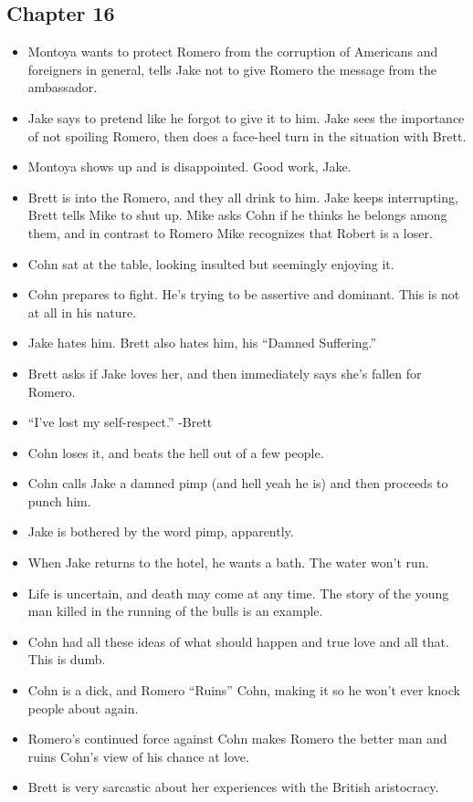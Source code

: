 \documentclass[11pt]{article}
\begin{document}
\subsection{Chapter 16}
\begin{itemize}
	\item Montoya wants to protect Romero from the corruption of Americans and
		foreigners in general, tells Jake not to give Romero the message from the
		ambassador.
	\item Jake says to pretend like he forgot to give it to him.  Jake sees the 
		importance of not spoiling Romero, then does a face-heel turn in the 
		situation with Brett.
	\item Montoya shows up and is disappointed.  Good work, Jake.
	\item Brett is into the Romero, and they all drink to him.  Jake keeps
		interrupting, Brett tells Mike to shut up.  Mike asks Cohn if he thinks
		he belongs among them, and in contrast to Romero Mike recognizes that 
		Robert is a loser.
	\item Cohn sat at the table, looking insulted but seemingly enjoying it.
	\item Cohn prepares to fight.  He's trying to be assertive and dominant.  
		This is not at all in his nature.
	\item Jake hates him.  Brett also hates him, his ``Damned Suffering.'' 
	\item Brett asks if Jake loves her, and then immediately says she's fallen
		for Romero.
	\item ``I've lost my self-respect.'' -Brett
	\item Cohn loses it, and beats the hell out of a few people.  
	\item Cohn calls Jake a damned pimp (and hell yeah he is) and then proceeds
		to punch him.
	\item Jake is bothered by the word pimp, apparently.
	\item When Jake returns to the hotel, he wants a bath.  The water won't
		run.  
	\item Life is uncertain, and death may come at any time.  The story of the
		young man killed in the running of the bulls is an example.
	\item Cohn had all these ideas of what should happen and true love and all 
		that.  This is dumb.
	\item Cohn is a dick, and Romero ``Ruins'' Cohn, making it so he won't ever
		knock people about again.
	\item Romero's continued force against Cohn makes Romero the better man and
		ruins Cohn's view of his chance at love.  
	\item Brett is very sarcastic about her experiences with the British
		aristocracy.  
\end{itemize}
\end{document}
